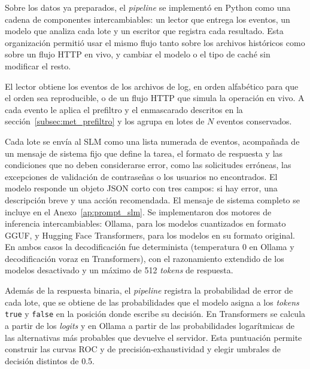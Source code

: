 Sobre los datos ya preparados, el \textit{pipeline} se implementó en Python como una cadena de componentes intercambiables: un lector que entrega los eventos, un modelo que analiza cada lote y un escritor que registra cada resultado. Esta organización permitió usar el mismo flujo tanto sobre los archivos históricos como sobre un flujo HTTP en vivo, y cambiar el modelo o el tipo de caché sin modificar el resto.


El lector obtiene los eventos de los archivos de log, en orden alfabético para que el orden sea reproducible, o de un flujo HTTP que simula la operación en vivo. A cada evento le aplica el prefiltro y el enmascarado descritos en la sección~\ref{subsec:met_prefiltro} y los agrupa en lotes de $N$ eventos conservados.


Cada lote se envía al SLM como una lista numerada de eventos, acompañada de un mensaje de sistema fijo que define la tarea, el formato de respuesta y las condiciones que no deben considerarse error, como las solicitudes erróneas, las excepciones de validación de contraseñas o los usuarios no encontrados. El modelo responde un objeto JSON corto con tres campos: si hay error, una descripción breve y una acción recomendada. El mensaje de sistema completo se incluye en el Anexo~\ref{ap:prompt_slm}. Se implementaron dos motores de inferencia intercambiables: Ollama, para los modelos cuantizados en formato GGUF, y Hugging Face Transformers, para los modelos en su formato original. En ambos casos la decodificación fue determinista (temperatura 0 en Ollama y decodificación voraz en Transformers), con el razonamiento extendido de los modelos desactivado y un máximo de 512 \textit{tokens} de respuesta.


Además de la respuesta binaria, el \textit{pipeline} registra la probabilidad de error de cada lote, que se obtiene de las probabilidades que el modelo asigna a los \textit{tokens} \texttt{true} y \texttt{false} en la posición donde escribe su decisión. En Transformers se calcula a partir de los \textit{logits} y en Ollama a partir de las probabilidades logarítmicas de las alternativas más probables que devuelve el servidor. Esta puntuación permite construir las curvas ROC y de precisión-exhaustividad y elegir umbrales de decisión distintos de 0.5.


